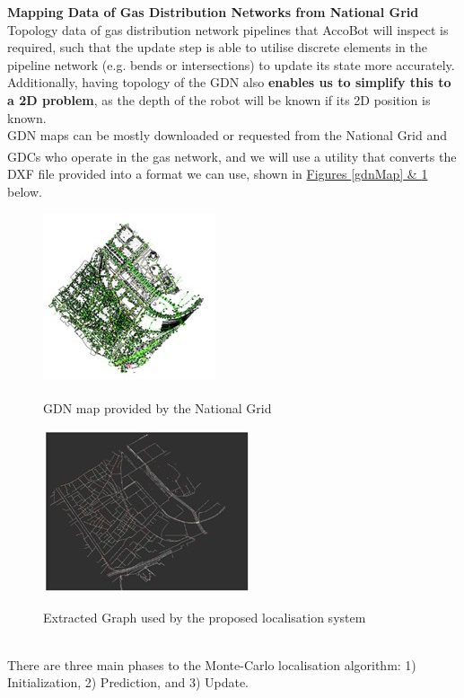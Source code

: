 \documentclass[11pt]{article}		%
\newlength{\imageheight}	 %
\newcommand{\supercite}[1]{\textsuperscript{\cite{#1}}}		%
\begin{document}
        \textbf{Mapping Data of Gas Distribution Networks from National Grid}
        \\
        Topology data of gas distribution network pipelines that AccoBot will inspect is required, such that the update step is able to utilise discrete elements in the pipeline network (e.g. bends or intersections) to update its state more accurately. Additionally, having topology of the GDN also \textbf{enables us to simplify this to a 2D problem}, as the depth of the robot will be known if its 2D position is known.
        \\
        \hspace*{3ex}GDN maps can be mostly downloaded or requested from the National Grid and GDCs who operate in the gas network\supercite{GDNMap}, and we will use a utility that converts the DXF file provided into a format we can use, shown in \hyperref[gdnMap]{Figures \ref*{gdnMap} \& \ref*{localisationMap}} below.
			\begin{figure}[h]
					\centering
					\begin{multicols}{2}
						\includegraphics[height=\imageheight]{map1.jpg}
						\caption{GDN map provided by the National Grid\supercite{sewerpaper}}
						\label{gdnMap}
						\columnbreak
						\includegraphics[height=\imageheight]{map2.jpg}
						\caption{Extracted Graph used by the proposed localisation system}
						\label{localisationMap}
					\end{multicols}
				\end{figure}
		\vspace{-0.5cm}
        \\
        \hspace*{3ex}There are three main phases to the Monte-Carlo localisation algorithm: 1) Initialization, 2) Prediction, and 3) Update.
	    
\end{document}

